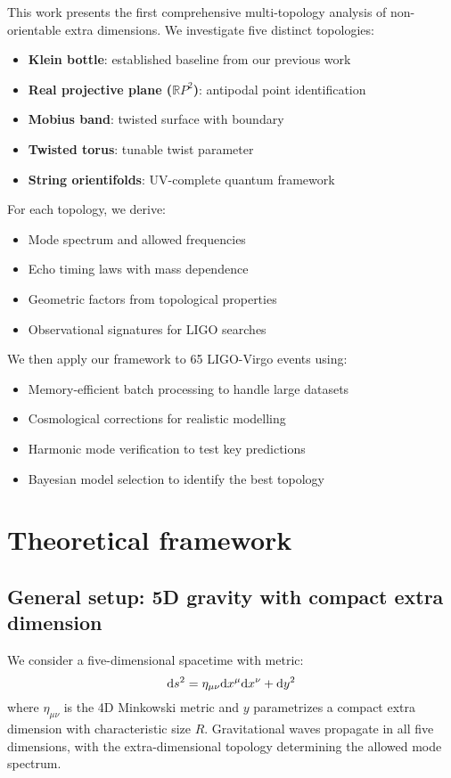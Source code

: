 \documentclass[12pt]{iopart}
\begin{document}
This work presents the first comprehensive multi-topology analysis of non-orientable extra dimensions. We investigate five distinct topologies:

\begin{itemize}
\item \textbf{Klein bottle}: established baseline from our previous work \cite{dibacco2025}
\item \textbf{Real projective plane ($\mathbb{R}P^2$)}: antipodal point identification
\item \textbf{Mobius band}: twisted surface with boundary
\item \textbf{Twisted torus}: tunable twist parameter
\item \textbf{String orientifolds}: UV-complete quantum framework
\end{itemize}

For each topology, we derive:
\begin{itemize}
\item Mode spectrum and allowed frequencies
\item Echo timing laws with mass dependence
\item Geometric factors from topological properties
\item Observational signatures for LIGO searches
\end{itemize}

We then apply our framework to 65 LIGO-Virgo events using:
\begin{itemize}
\item Memory-efficient batch processing to handle large datasets
\item Cosmological corrections for realistic modelling
\item Harmonic mode verification to test key predictions
\item Bayesian model selection to identify the best topology
\end{itemize}

\section{Theoretical framework}

\subsection{General setup: 5D gravity with compact extra dimension}

We consider a five-dimensional spacetime with metric:
\begin{equation}
{\rm d}s^2 = \eta_{\mu\nu} {\rm d}x^\mu {\rm d}x^\nu + {\rm d}y^2
\end{equation}
where $\eta_{\mu\nu}$ is the 4D Minkowski metric and $y$ parametrizes a compact extra dimension with characteristic size $R$. Gravitational waves propagate in all five dimensions, with the extra-dimensional topology determining the allowed mode spectrum.
\end{document}
